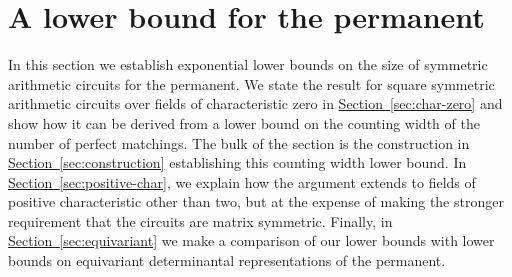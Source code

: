 \documentclass[11pt]{article}
\newcommand{\expref}[2]{\texorpdfstring{\hyperref[#2]{#1~\ref{#2}}}{#1~\ref{#2}}}
\begin{document}
\section{A lower bound for the permanent} %
\label{sec:permanent}
In this section we establish exponential lower bounds on the size of symmetric
arithmetic circuits for the permanent.  We state the result for square
symmetric arithmetic circuits over fields of characteristic zero in
\expref{Section}{sec:char-zero} and show how it can be derived from a
lower bound on the counting width of the number of perfect matchings.
The bulk of the section is the construction in
\expref{Section}{sec:construction} establishing this counting width lower
bound.  In \expref{Section}{sec:positive-char},  we explain how the
argument extends to fields of positive characteristic other than two,
but at the expense of making the stronger requirement that the
circuits are matrix symmetric.  Finally, in
\expref{Section}{sec:equivariant} we make a comparison of our lower bounds
with lower bounds on equivariant determinantal representations of the permanent.
\end{document}
